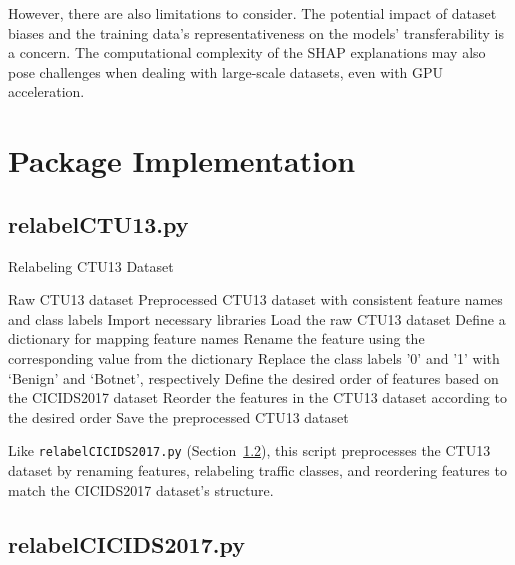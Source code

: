However, there are also limitations to consider. The potential impact of dataset biases and the training data's representativeness on the models' transferability is a concern. The computational complexity of the SHAP explanations may also pose challenges when dealing with large-scale datasets, even with GPU acceleration.

\section{Package Implementation}\label{sec:package-implementation}

\subsection{relabelCTU13.py}\label{subsec:relabelCTU13.py}

\begin{algorithm}[H]
\caption{Relabeling CTU13 Dataset}\label{alg:relabelCTU13}
\begin{algorithmic}[1]
\Require%
Raw CTU13 dataset
\Ensure%
Preprocessed CTU13 dataset with consistent feature names and class labels
\State%
Import necessary libraries
\State%
Load the raw CTU13 dataset
\State%
Define a dictionary for mapping feature names
        \State%
        Rename the feature using the corresponding value from the dictionary
    \EndIf%
\EndFor%
\State%
Replace the class labels '0' and '1' with `Benign' and `Botnet', respectively 
\State%
Define the desired order of features based on the CICIDS2017 dataset
\State%
Reorder the features in the CTU13 dataset according to the desired order
\State%
Save the preprocessed CTU13 dataset
\end{algorithmic}
\end{algorithm}

Like \texttt{relabelCICIDS2017.py} (Section~\ref{subsec:relabelCICIDS2017.py}), this script preprocesses the CTU13 dataset by renaming features, relabeling traffic classes, and reordering features to match the CICIDS2017 dataset's structure.

\subsection{relabelCICIDS2017.py}\label{subsec:relabelCICIDS2017.py}


